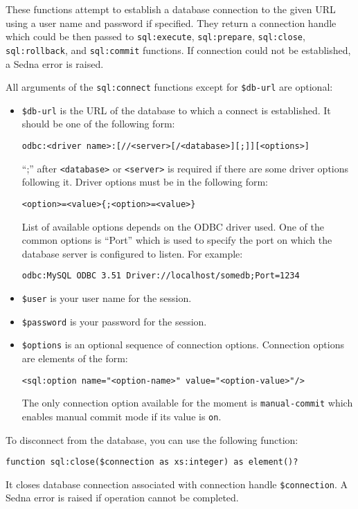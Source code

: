 \documentclass[a4paper,12pt]{article}
\begin{document}
These functions attempt to establish a database connection to the given URL
using a user name and password if specified. They return a connection handle
which could be then passed to \verb!sql:execute!, \verb!sql:prepare!,
\verb!sql:close!, \verb!sql:rollback!, and \verb!sql:commit! functions. If
connection could not be established, a Sedna error is raised.

All arguments of the \verb!sql:connect! functions except for \verb!$db-url! are
optional:

\begin{itemize}
\item\verb!$db-url! is the URL of the database to which a connect is
established. It should be one of the following form:
\small{\begin{verbatim}
odbc:<driver name>:[//<server>[/<database>][;]][<options>]
\end{verbatim}}
``;'' after \verb!<database>! or \verb!<server>! is required if there are some
driver options following it. Driver options must be in the following form:
\begin{verbatim}
<option>=<value>{;<option>=<value>}
\end{verbatim}
List of available options depends on the ODBC driver used. One of the common
options is ``Port'' which is used to specify the port on which the database
server is configured to listen. For example:
\small{\begin{verbatim}
odbc:MySQL ODBC 3.51 Driver://localhost/somedb;Port=1234
\end{verbatim}}
\item\verb!$user! is your user name for the session.
\item\verb!$password! is your password for the session.
\item\verb!$options! is an optional sequence of connection options. Connection
options are elements of the form:
\begin{verbatim}
<sql:option name="<option-name>" value="<option-value>"/>
\end{verbatim}
The only connection option available for the moment is \verb!manual-commit!
which enables manual commit mode if its value is \verb!on!.
\end{itemize}

To disconnect from the database, you can use the following function:
\begin{verbatim}
function sql:close($connection as xs:integer) as element()?
\end{verbatim}
It closes database connection associated with connection handle
\verb!$connection!. A Sedna error is raised if operation cannot be completed.
\end{document}
